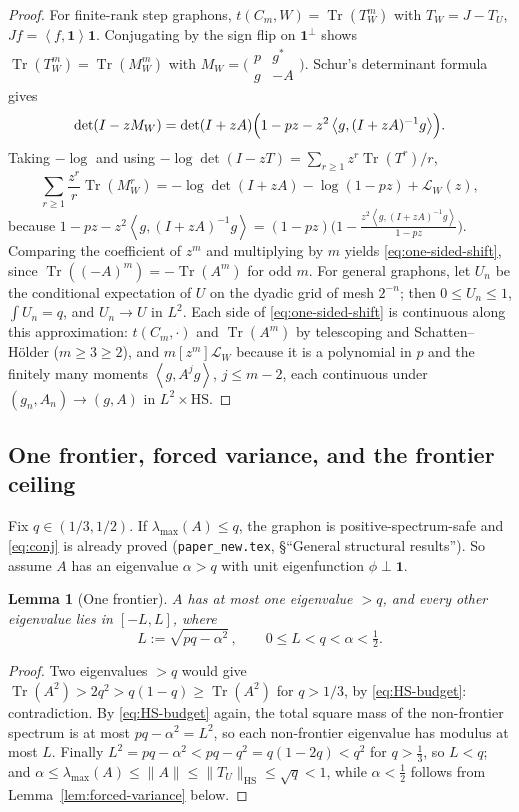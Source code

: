 \documentclass[11pt]{article}
\newtheorem{lemma}[theorem]{Lemma}
\newcommand{\one}{\mathbf 1}
\newcommand{\ip}[2]{\left\langle #1,#2\right\rangle}
\newcommand{\Tr}{\operatorname{Tr}}
\newcommand{\cL}{\mathcal L}
\begin{document}
\begin{proof}
For finite-rank step graphons, $t(C_m,W)=\Tr(T_W^m)$ with $T_W=J-T_U$,
$Jf=\ip f\one\one$.  Conjugating by the sign flip on $\one^\perp$ shows
$\Tr(T_W^m)=\Tr(M_W^m)$ with
$M_W=\bigl(\begin{smallmatrix}p&g^*\\ g&-A\end{smallmatrix}\bigr)$.
Schur's determinant formula gives
\[
        \det(I-zM_W)=\det(I+zA)\Bigl(1-pz-z^2\ip{g}{(I+zA)^{-1}g}\Bigr).
\]
Taking $-\log$ and using $-\log\det(I-zT)=\sum_{r\ge1}z^r\Tr(T^r)/r$,
\[
        \sum_{r\ge1}\frac{z^r}{r}\Tr(M_W^r)
        =-\log\det(I+zA)-\log(1-pz)+\cL_W(z),
\]
because $1-pz-z^2\ip{g}{(I+zA)^{-1}g}
=(1-pz)\bigl(1-\frac{z^2\ip{g}{(I+zA)^{-1}g}}{1-pz}\bigr)$.
Comparing the coefficient of $z^m$ and multiplying by $m$ yields
\eqref{eq:one-sided-shift}, since $\Tr((-A)^m)=-\Tr(A^m)$ for odd $m$.
For general graphons, let $U_n$ be the conditional expectation of $U$ on the
dyadic grid of mesh $2^{-n}$; then $0\le U_n\le1$, $\int U_n=q$, and $U_n\to U$
in $L^2$.  Each side of \eqref{eq:one-sided-shift} is continuous along this
approximation: $t(C_m,\cdot)$ and $\Tr(A^m)$ by telescoping and
Schatten--H\"older ($m\ge3\ge2$), and $m[z^m]\cL_W$ because it is a polynomial
in $p$ and the finitely many moments $\ip g{A^jg}$, $j\le m-2$, each continuous
under $(g_n,A_n)\to(g,A)$ in $L^2\times\mathrm{HS}$.
\end{proof}

\subsection{One frontier, forced variance, and the frontier ceiling}

Fix $q\in(1/3,1/2)$.  If $\lambda_{\max}(A)\le q$, the graphon is
positive-spectrum-safe and \eqref{eq:conj} is already proved
(\texttt{paper\_new.tex}, \S ``General structural results'').  So assume $A$ has
an eigenvalue $\alpha>q$ with unit eigenfunction $\phi\perp\one$.

\begin{lemma}[One frontier]\label{lem:one-frontier}
$A$ has at most one eigenvalue $>q$, and every other eigenvalue lies in
$[-L,L]$, where
\[
        L:=\sqrt{pq-\alpha^2}\,,\qquad 0\le L<q<\alpha<\tfrac12 .
\]
\end{lemma}

\begin{proof}
Two eigenvalues $>q$ would give $\Tr(A^2)>2q^2>q(1-q)\ge\Tr(A^2)$ for
$q>1/3$, by \eqref{eq:HS-budget}: contradiction.  By \eqref{eq:HS-budget}
again, the total square mass of the non-frontier spectrum is at most
$pq-\alpha^2=L^2$, so each non-frontier eigenvalue has modulus at most $L$.
Finally $L^2=pq-\alpha^2<pq-q^2=q(1-2q)<q^2$ for $q>\tfrac13$, so $L<q$; and
$\alpha\le\lambda_{\max}(A)\le\|A\|\le\|T_U\|_{\mathrm{HS}}\le\sqrt q<1$,
while $\alpha<\tfrac12$ follows from Lemma~\ref{lem:forced-variance} below.
\end{proof}
\end{document}

